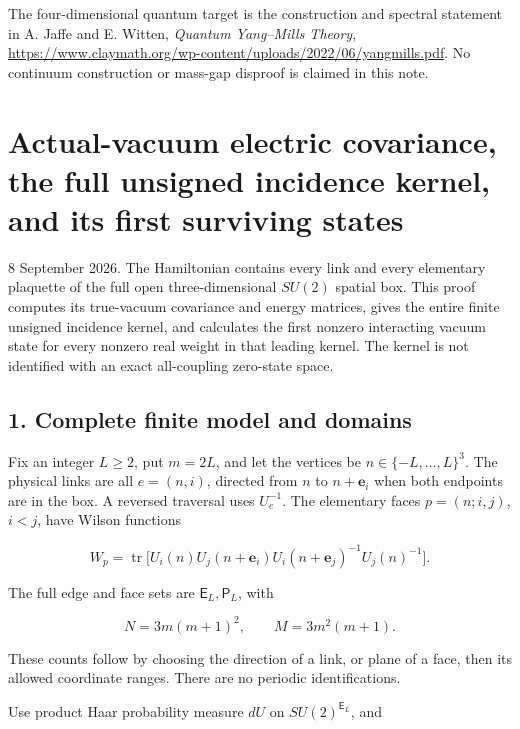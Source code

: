 \documentclass[
  11pt,
]{article}
\begin{document}
The four-dimensional quantum target is the construction and spectral
statement in A. Jaffe and E. Witten, \emph{Quantum Yang--Mills Theory},
\url{https://www.claymath.org/wp-content/uploads/2022/06/yangmills.pdf}.
No continuum construction or mass-gap disproof is claimed in this note.

\clearpage
\section{Actual-vacuum electric covariance, the full unsigned incidence
kernel, and its first surviving
states}\label{magnetic-part-4-actual-vacuum-electric-covariance-the-full-unsigned-incidence-kernel-and-its-first-surviving-states}

8 September 2026. The Hamiltonian contains every link and every
elementary plaquette of the full open three-dimensional \(SU(2)\)
spatial box. This proof computes its true-vacuum covariance and energy
matrices, gives the entire finite unsigned incidence kernel, and
calculates the first nonzero interacting vacuum state for every nonzero
real weight in that leading kernel. The kernel is not identified with an
exact all-coupling zero-state space.

\subsection{1. Complete finite model and
domains}\label{magnetic-part-4-complete-finite-model-and-domains}

Fix an integer \(L\ge2\), put \(m=2L\), and let the vertices be
\(n\in\{-L,\ldots,L\}^3\). The physical links are all \(e=(n,i)\),
directed from \(n\) to \(n+\mathbf e_i\) when both endpoints are in the
box. A reversed traversal uses \(U_e^{-1}\). The elementary faces
\(p=(n;i,j)\), \(i<j\), have Wilson functions

\[
W_p=\operatorname{tr}\big[
U_i(n)U_j(n+\mathbf e_i)U_i(n+\mathbf e_j)^{-1}U_j(n)^{-1}
\big].
\tag{1.1}
\]

The full edge and face sets are \(\mathsf E_L,\mathsf P_L\), with

\[
N=3m(m+1)^2,\qquad M=3m^2(m+1).
\tag{1.2}
\]

These counts follow by choosing the direction of a link, or plane of a
face, then its allowed coordinate ranges. There are no periodic
identifications.

Use product Haar probability measure \(dU\) on \(SU(2)^{\mathsf E_L}\),
and
\end{document}
